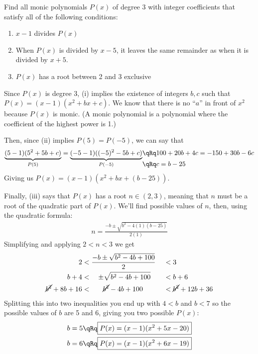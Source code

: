 \begin{problem}
    Find all monic polynomials $P(x)$ of degree 3 with integer coefficients that satisfy all of the following conditions:
    \begin{enumerate}[label=(\roman*), topsep=1mm]
        \item $x-1$ divides $P(x)$
        \item When $P(x)$ is divided by $x-5$, it leaves the same remainder as when it is divided by $x+5$.
        \item $P(x)$ has a root between 2 and 3 exclusive
    \end{enumerate}%
\end{problem}

\begin{solution}
    Since $P(x)$ is degree 3, (i) implies the existence of integers $b,c$ such that $P(x) = (x-1)(x^2+bx+c)$. We know that there is no ``$a$'' in front of $x^2$ because $P(x)$ is monic. (A monic polynomial is a polynomial where the coefficient of the highest power is 1.)

    Then, since (ii) implies $P(5) = P(-5)$, we can say that
    \begin{align*}
        \underbrace{(5-1)(5^2+5b+c)}_{P(5)} = \underbrace{(-5-1)((-5)^2-5b+c)}_{P(-5)} &\qRq 100+20b+4c = -150 +30b-6c\\[-15pt]
        &\qRq c = b - 25
    \end{align*}
    Giving us $P(x)=(x-1)(x^2+bx+(b-25))$.
    
    Finally, (iii) says that $P(x)$ has a root $n\in(2,3)$, meaning that $n$ must be a root of the quadratic part of $P(x)$. We'll find possible values of $n$, then, using the quadratic formula:
    \begin{align*}
        n=\frac{-b \pm \sqrt{b^2-4(1)(b-25)}}{2(1)}
    \end{align*}
    Simplifying and applying $2<n<3$ we get
    \begin{alignat*}{2}
        2 &< \frac{-b \pm \sqrt{b^2-4b+100}}{2} \, &&< 3 \\
        b + 4 &< \quad \pm\sqrt{b^2-4b+100} \, &&< b + 6 \\
        \cancel{b^2} + 8b + 16 &< \quad \ \ \cancel{b^2} - 4b + 100 \, &&< \cancel{b^2} + 12b + 36
    \end{alignat*}
    Splitting this into two inequalities you end up with $4<b$ and $b<7$ so the possible values of $b$ are 5 and 6, giving you two possible $P(x)$:
    \begin{align*}
        b=5 &\qRq \boxed{P(x) = (x-1)(x^2+5x-20)}\\
        b=6 &\qRq \boxed{P(x) = (x-1)(x^2+6x-19)}
    \end{align*}
\end{solution}


